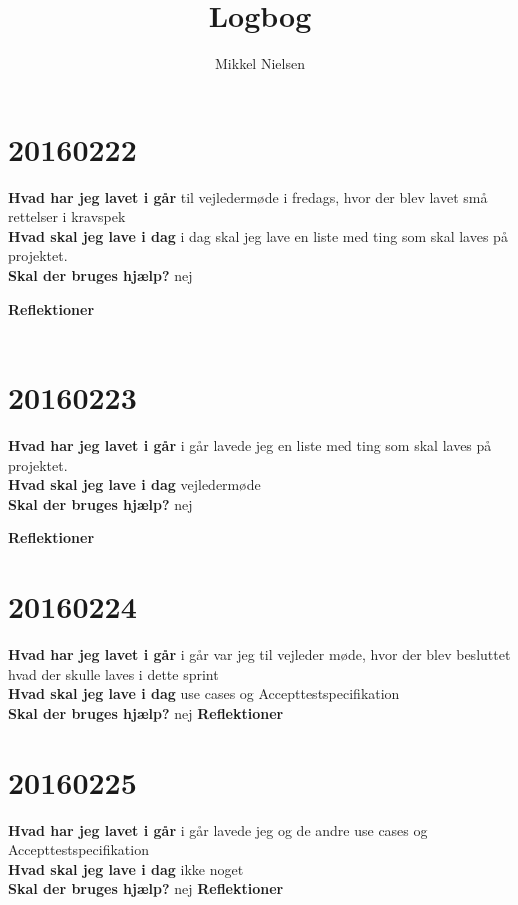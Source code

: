 \documentclass{article}
\title{Logbog}
\author{Mikkel Nielsen}
\date{}
\begin{document}
	\maketitle
	\tableofcontents
	
	\section{20160222}
	
	\textbf{Hvad har jeg lavet i går}
	til vejledermøde i fredags, hvor der blev lavet små rettelser i kravspek\\
	\textbf{Hvad skal jeg lave i dag}
	i dag skal jeg lave en liste med ting som skal laves på projektet.\\
	\textbf{Skal der bruges hjælp?}
	nej
	
	\textbf{Reflektioner}
	\\
	\\
		\section{20160223}
		
		\textbf{Hvad har jeg lavet i går}
			i går lavede jeg en liste med ting som skal laves på projektet.
		\\
		\textbf{Hvad skal jeg lave i dag}
		vejledermøde
		\\
		\textbf{Skal der bruges hjælp?}
		nej
		
		\textbf{Reflektioner}
		
			\section{20160224}
			
			\textbf{Hvad har jeg lavet i går}
			i går var jeg til vejleder møde, hvor der blev besluttet hvad der skulle laves i dette sprint
			\\
			\textbf{Hvad skal jeg lave i dag}
			use cases og Accepttestspecifikation
			\\
			\textbf{Skal der bruges hjælp?}
			nej
			\textbf{Reflektioner}
			
			\section{20160225}
			
			\textbf{Hvad har jeg lavet i går}
			i går lavede jeg og de andre 	use cases og Accepttestspecifikation
			\\
			\textbf{Hvad skal jeg lave i dag}
		     ikke noget
			\\
			\textbf{Skal der bruges hjælp?}
			nej
			\textbf{Reflektioner}
			
\end{document}
